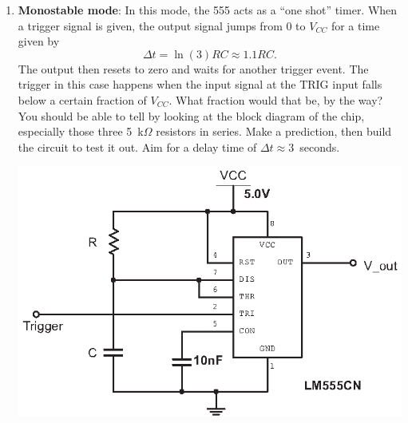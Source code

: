 \begin{enumerate}[wide]
\pagebreak[3]
\item \textbf{Monostable mode}: In this mode, the 555 acts as a ``one shot'' timer.  When a trigger signal is given, the output signal jumps from 0 to $V_{CC}$ for a time given by 
$$\Delta t = \ln (3) RC \approx 1.1 RC.$$
The output then resets to zero and waits for another trigger event.  The trigger in this case happens when the input signal at the TRIG input falls below a certain fraction of $V_{CC}$.  What fraction would that be, by the way?  You should be able to tell by looking at the block diagram of the chip, especially those three 5~k$\Omega$ resistors in series.  Make a prediction, then build the circuit to test it out.  Aim for a delay time of $\Delta t \approx 3$~seconds.
\begin{center}
\includegraphics{timers/monostable_555.eps}
\end{center}


\end{enumerate}
